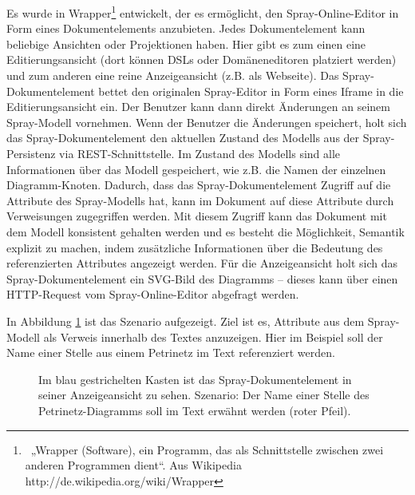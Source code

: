 
Es wurde in Wrapper\footnote{~„Wrapper (Software), ein Programm, das als Schnittstelle zwischen zwei anderen Programmen dient“. Aus Wikipedia http://de.wikipedia.org/wiki/Wrapper} entwickelt, der es ermöglicht, den Spray-Online-Editor in Form eines Dokumentelements anzubieten. Jedes Dokumentelement kann beliebige Ansichten oder Projektionen haben. Hier gibt es zum einen eine Editierungsansicht (dort können DSLs oder Domäneneditoren platziert werden) und zum anderen eine reine Anzeigeansicht (z.B. als Webseite). Das Spray-Dokumentelement bettet den originalen Spray-Editor in Form eines Iframe in die Editierungsansicht ein. Der Benutzer kann dann direkt Änderungen an seinem Spray-Modell vornehmen. Wenn der Benutzer die Änderungen speichert, holt sich das Spray-Dokumentelement den aktuellen Zustand des Modells aus der Spray-Persistenz via REST-Schnittstelle. Im Zustand des Modells sind alle Informationen über das Modell gespeichert, wie z.B. die Namen der einzelnen Diagramm-Knoten. Dadurch, dass das Spray-Dokumentelement Zugriff auf die Attribute des Spray-Modells hat, kann im Dokument auf diese Attribute durch Verweisungen zugegriffen werden. Mit diesem Zugriff kann das Dokument mit dem Modell konsistent gehalten werden und es besteht die Möglichkeit, Semantik explizit zu machen, indem zusätzliche Informationen über die Bedeutung des referenzierten Attributes angezeigt werden. Für die Anzeigeansicht holt sich das Spray-Dokumentelement ein SVG-Bild des Diagramms -- dieses kann über einen HTTP-Request vom Spray-Online-Editor abgefragt werden.

 
In Abbildung \ref{sprayanzeigen} ist das Szenario aufgezeigt. Ziel ist es, Attribute aus dem Spray-Modell als Verweis innerhalb des Textes anzuzeigen. Hier im Beispiel soll der Name einer Stelle aus einem Petrinetz im Text referenziert werden.

 
\begin{figure}[h!]
\centering
{}
\caption[Spray-Dokumentelement Repräsentation]{ Im blau gestrichelten Kasten ist das Spray-Dokumentelement in seiner Anzeigeansicht zu sehen. Szenario: Der Name einer Stelle des Petrinetz-Diagramms soll im Text erwähnt werden (roter Pfeil). }\label{sprayanzeigen}
\end{figure}
 
